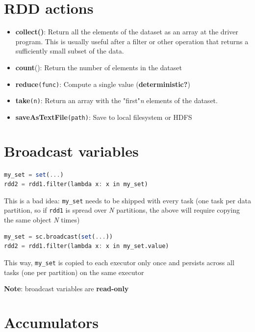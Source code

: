 \documentclass[11pt]{article}
\begin{document}
\section*{RDD actions}

\begin{itemize}
	\item \textbf{collect()}: Return all the elements of the dataset as an array at the driver program. This is usually useful after a filter or other operation that returns a sufficiently small subset of the data.
	\item \textbf{count}(): Return the number of elements in the dataset
	\item \textbf{reduce}\verb|(func)|: Compute a single value (\textbf{deterministic?})
	\item \textbf{take}\verb|(n)|: Return an array with the "first"\textit{n} elements of the dataset.
	\item \textbf{saveAsTextFile}\verb|(path)|: Save to local filesystem or HDFS
\end{itemize}

\section*{Broadcast variables}

\begin{minipage}{0.48\textwidth}
\begin{lstlisting}[language=Octave]
my_set = set(...)
rdd2 = rdd1.filter(lambda x: x in my_set)
\end{lstlisting}
This is a bad idea: \verb|my_set| needs to be shipped with every task (one task per data partition, so if \verb|rdd1| is spread over \textit{N} partitions, the above will require copying the same object \textit{N} times)
\end{minipage}
\hfill
\begin{minipage}{0.48\textwidth}
\begin{lstlisting}[language=Octave]
my_set = sc.broadcast(set(...))
rdd2 = rdd1.filter(lambda x: x in my_set.value)
\end{lstlisting}
This way, \verb|my_set| is copied to each executor only once and persists across all tasks (one per partition) on the same executor
\end{minipage}

\textbf{Note}: broadcast variables are \textbf{read-only}

\section*{Accumulators}
\end{document}
